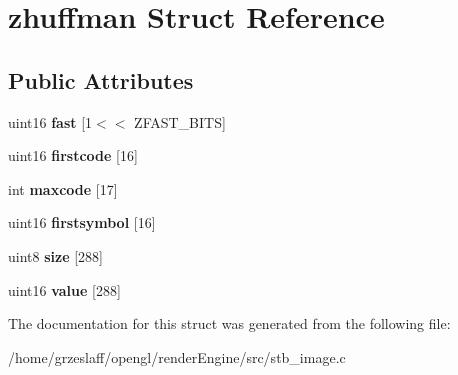 \hypertarget{structzhuffman}{\section{zhuffman Struct Reference}
\label{structzhuffman}
}
\subsection*{Public Attributes}
\begin{DoxyCompactItemize}
\item 
\hypertarget{structzhuffman_a12d5f92a121b65680e5f0b4027d00c96}{uint16 {\bfseries fast} \mbox{[}1$<$$<$ Z\-F\-A\-S\-T\-\_\-\-B\-I\-T\-S\mbox{]}}\label{structzhuffman_a12d5f92a121b65680e5f0b4027d00c96}

\item 
\hypertarget{structzhuffman_a81f5ae5bd31b40439955de6154572917}{uint16 {\bfseries firstcode} \mbox{[}16\mbox{]}}\label{structzhuffman_a81f5ae5bd31b40439955de6154572917}

\item 
\hypertarget{structzhuffman_ac7dd4a2bf01a6e27933dd1cf6b0cc762}{int {\bfseries maxcode} \mbox{[}17\mbox{]}}\label{structzhuffman_ac7dd4a2bf01a6e27933dd1cf6b0cc762}

\item 
\hypertarget{structzhuffman_afbdb21fd99f413fc8f9e58243552fe95}{uint16 {\bfseries firstsymbol} \mbox{[}16\mbox{]}}\label{structzhuffman_afbdb21fd99f413fc8f9e58243552fe95}

\item 
\hypertarget{structzhuffman_a46ce4d4a4d7fc41c2560616f6696e9b9}{uint8 {\bfseries size} \mbox{[}288\mbox{]}}\label{structzhuffman_a46ce4d4a4d7fc41c2560616f6696e9b9}

\item 
\hypertarget{structzhuffman_acc395b638b700b944c329d71a8b82084}{uint16 {\bfseries value} \mbox{[}288\mbox{]}}\label{structzhuffman_acc395b638b700b944c329d71a8b82084}

\end{DoxyCompactItemize}


The documentation for this struct was generated from the following file\-:\begin{DoxyCompactItemize}
\item 
/home/grzeslaff/opengl/render\-Engine/src/stb\-\_\-image.\-c\end{DoxyCompactItemize}
